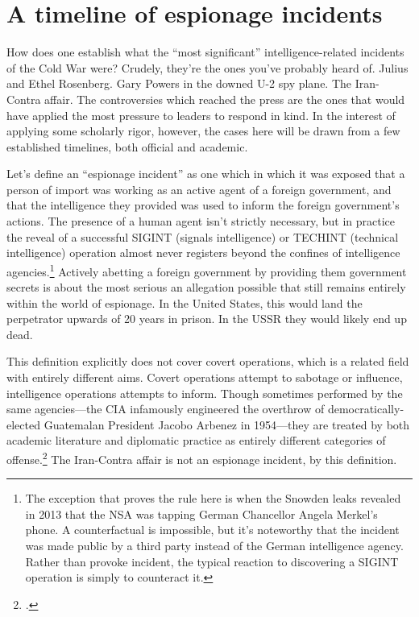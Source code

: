 \documentclass[12pt]{article}
\begin{document}
\section{A timeline of espionage incidents}
How does one establish what the ``most significant'' intelligence-related incidents of the Cold War were? Crudely, they're the ones you've probably heard of. Julius and Ethel Rosenberg. Gary Powers in the downed U-2 spy plane. The Iran-Contra affair. The controversies which reached the press are the ones that would have applied the most pressure to leaders to respond in kind. In the interest of applying some scholarly rigor, however, the cases here will be drawn from a few established timelines, both official and academic.

Let's define an ``espionage incident'' as one which in which it was exposed that a person of import was working as an active agent of a foreign government, and that the intelligence they provided was used to inform the foreign government's actions. The presence of a human agent isn't strictly necessary, but in practice the reveal of a successful SIGINT (signals intelligence) or TECHINT (technical intelligence) operation almost never registers beyond the confines of intelligence agencies.\footnote{The exception that proves the rule here is when the Snowden leaks revealed in 2013 that the NSA was tapping German Chancellor Angela Merkel's phone. A counterfactual is impossible, but it's noteworthy that the incident was made public by a third party instead of the German intelligence agency. Rather than provoke incident, the typical reaction to discovering a SIGINT operation is simply to counteract it.} Actively abetting a foreign government by providing them government secrets is about the most serious an allegation possible that still remains entirely within the world of espionage. In the United States, this would land the perpetrator upwards of 20 years in prison. In the USSR they would likely end up dead.

This definition explicitly does not cover covert operations, which is a related field with entirely different aims. Covert operations attempt to sabotage or influence, intelligence operations attempts to inform. Though sometimes performed by the same agencies---the CIA infamously engineered the overthrow of democratically-elected Guatemalan President Jacobo Arbenez in 1954---they are treated by both academic literature and diplomatic practice as entirely different categories of offense.\footcite{fraser_architecture_2005} The Iran-Contra affair is not an espionage incident, by this definition.
\end{document}
